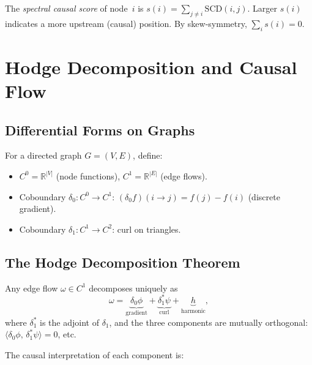 \documentclass[twoside,11pt]{article}
\newcommand{\R}{\mathbb{R}}
\newcommand{\SCD}{\mathrm{SCD}}
\begin{document}
\begin{definition}
\label{def:causal-score}
The \emph{spectral causal score} of node~$i$ is
$s(i)=\sum_{j\ne i}\SCD(i,j)$.  Larger $s(i)$ indicates a more
upstream (causal) position.  By skew-symmetry, $\sum_i s(i)=0$.
\end{definition}

\section{Hodge Decomposition and Causal Flow}
\label{sec:hodge}

\subsection{Differential Forms on Graphs}

\begin{definition}
\label{def:cochain}
For a directed graph $G=(V,E)$, define:
\begin{itemize}
\item $C^0=\R^{|V|}$ (node functions), \quad
  $C^1=\R^{|E|}$ (edge flows).
\item Coboundary $\delta_0:C^0\to C^1$:
  $(\delta_0 f)(i\to j)=f(j)-f(i)$ (discrete gradient).
\item Coboundary $\delta_1:C^1\to C^2$: curl on triangles.
\end{itemize}
\end{definition}

\subsection{The Hodge Decomposition Theorem}

\begin{theorem}
\label{thm:hodge}
Any edge flow $\omega\in C^1$ decomposes uniquely as
\begin{equation}
\label{eq:hodge}
  \omega = \underbrace{\delta_0\phi}_{\text{gradient}}
  + \underbrace{\delta_1^*\psi}_{\text{curl}}
  + \underbrace{h}_{\text{harmonic}},
\end{equation}
where $\delta_1^*$ is the adjoint of $\delta_1$, and the three
components are mutually orthogonal:
$\langle\delta_0\phi,\,\delta_1^*\psi\rangle=0$, etc.
\end{theorem}

The causal interpretation of each component is:
\end{document}
